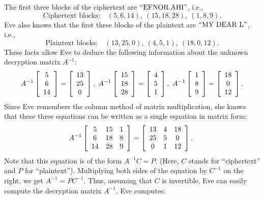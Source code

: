 \documentclass{ximera}
\begin{document}
\begin{solution}
  The first three blocks of the ciphertext are $\q{EFNOR.AHI}$, i.e.,
  \begin{equation*}
    \mbox{Ciphertext blocks:}\quad
    (5,6,14),\
    (15,18,28),\
    (1,8,9).
  \end{equation*}
  Eve also knows that the first three blocks of the plaintext are
  $\q{MY DEAR L}$, i.e.,
  \begin{equation*}
    \mbox{Plaintext blocks:}\quad
    (13,25,0),\
    (4,5,1),\
    (18,0,12).
  \end{equation*}
  These facts allow Eve to deduce the following information about the
  unknown decryption matrix $A^{-1}$:
  \begin{equation*}
    A^{-1} \startmat{c} 5 \\ 6 \\ 14 \stopmat
    = \startmat{c} 13 \\ 25 \\ 0 \stopmat,\quad
    A^{-1} \startmat{c} 15 \\ 18 \\ 28 \stopmat
    = \startmat{c} 4 \\ 5 \\ 1 \stopmat,\quad
    A^{-1} \startmat{c} 1 \\ 8 \\ 9 \stopmat
    = \startmat{c} 18 \\ 0 \\ 12 \stopmat.
  \end{equation*}
  Since Eve remembers the column method of matrix multiplication, she
  knows that these three equations can be written as a single equation
  in matrix form:
  \begin{equation*}
    A^{-1} \startmat{ccc}
      5 & 15 & 1 \\
      6 & 18 & 8 \\
      14 & 28 & 9 \\
    \stopmat
    = \startmat{ccc}
      13 & 4 & 18 \\
      25 & 5 & 0 \\
      0 & 1 & 12 \\
    \stopmat.\quad
  \end{equation*}
  Note that this equation is of the form $A^{-1}C=P$. (Here, $C$
  stands for ``ciphertext'' and $P$ for ``plaintext''). Multiplying
  both sides of the equation by $C^{-1}$ on the right, we get
  $A^{-1} = PC^{-1}$. Thus, assuming that $C$ is invertible, Eve can
  easily compute the decryption matrix $A^{-1}$. Eve computes:

\end{solution}
\end{document}
